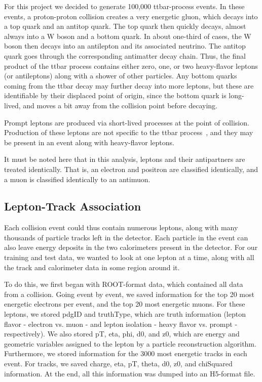 For this project we decided to generate 100,000 ttbar-process events. In these events, a proton-proton collision creates a very energetic gluon, which decays into a top quark and an antitop quark. The top quark then quickly decays, almost always into a W boson and a bottom quark. In about one-third of cases, the W boson then decays into an antilepton and its associated neutrino. The antitop quark goes through the corresponding antimatter decay chain. Thus, the final product of the ttbar process contains either zero, one, or two heavy-flavor leptons (or antileptons) along with a shower of other particles. Any bottom quarks coming from the ttbar decay may further decay into more leptons, but these are identifiable by their displaced point of origin, since the bottom quark is long-lived, and moves a bit away from the collision point before decaying.

Prompt leptons are produced via short-lived processes at the point of collision. Production of these leptons are not specific to the ttbar process~\cite{bodek}, and they may be present in an event along with heavy-flavor leptons.

It must be noted here that in this analysis, leptons and their antipartners are treated identically. That is, an electron and positron are classified identically, and a muon is classified identically to an antimuon.


\subsection{Lepton-Track Association}


Each collision event could thus contain numerous leptons, along with many thousands of particle tracks left in the detector. Each particle in the event can also leave energy deposits in the two calorimeters present in the detector. For our training and test data, we wanted to look at one lepton at a time, along with all the track and calorimeter data in some region around it.

To do this, we first began with ROOT-format data, which contained all data from a collision. Going event by event, we saved information for the top 20 most energetic electrons per event, and the top 20 most energetic muons. For these leptons, we stored pdgID and truthType, which are truth information (lepton flavor - electron vs. muon - and lepton isolation - heavy flavor vs. prompt - respectively). We also stored pT, eta, phi, d0, and z0, which are energy and geometric variables assigned to the lepton by a particle reconstruction algorithm. Furthermore, we stored information for the 3000 most energetic tracks in each event. For tracks, we saved charge, eta, pT, theta, d0, z0, and chiSquared information. At the end, all this information was dumped into an H5-format file.

